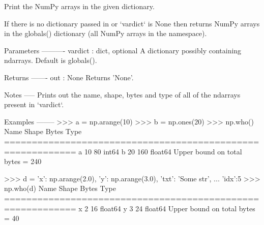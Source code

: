 \begin{DoxyVerb}Print the NumPy arrays in the given dictionary.

If there is no dictionary passed in or `vardict` is None then returns
NumPy arrays in the globals() dictionary (all NumPy arrays in the
namespace).

Parameters
----------
vardict : dict, optional
    A dictionary possibly containing ndarrays.  Default is globals().

Returns
-------
out : None
    Returns 'None'.

Notes
-----
Prints out the name, shape, bytes and type of all of the ndarrays
present in `vardict`.

Examples
--------
>>> a = np.arange(10)
>>> b = np.ones(20)
>>> np.who()
Name            Shape            Bytes            Type
===========================================================
a               10               80               int64
b               20               160              float64
Upper bound on total bytes  =       240

>>> d = {'x': np.arange(2.0), 'y': np.arange(3.0), 'txt': 'Some str',
... 'idx':5}
>>> np.who(d)
Name            Shape            Bytes            Type
===========================================================
x               2                16               float64
y               3                24               float64
Upper bound on total bytes  =       40\end{DoxyVerb}
 